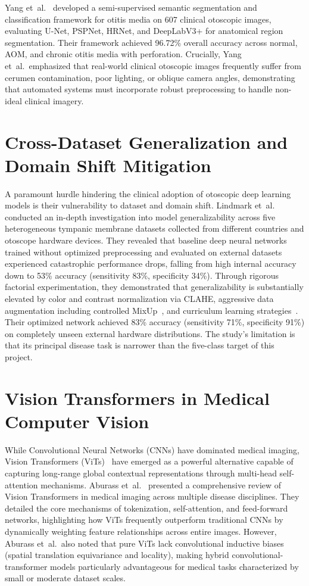 \documentclass[12pt,a4paper]{report}
\begin{document}
Yang et~al.~\cite{ref_yang2026_otitis} developed a semi-supervised semantic segmentation and classification framework for otitis media on 607 clinical otoscopic images, evaluating U-Net, PSPNet, HRNet, and DeepLabV3+ for anatomical region segmentation. Their framework achieved 96.72\% overall accuracy across normal, AOM, and chronic otitis media with perforation. Crucially, Yang et~al.\ emphasized that real-world clinical otoscopic images frequently suffer from cerumen contamination, poor lighting, or oblique camera angles, demonstrating that automated systems must incorporate robust preprocessing to handle non-ideal clinical imagery.

\section{Cross-Dataset Generalization and Domain Shift Mitigation}
A paramount hurdle hindering the clinical adoption of otoscopic deep learning models is their vulnerability to dataset and domain shift. Lindmark et~al.~\cite{ref_lindmark2024_generalizable} conducted an in-depth investigation into model generalizability across five heterogeneous tympanic membrane datasets collected from different countries and otoscope hardware devices. They revealed that baseline deep neural networks trained without optimized preprocessing and evaluated on external datasets experienced catastrophic performance drops, falling from high internal accuracy down to 53\% accuracy (sensitivity 83\%, specificity 34\%). Through rigorous factorial experimentation, they demonstrated that generalizability is substantially elevated by color and contrast normalization via CLAHE, aggressive data augmentation including controlled MixUp~\cite{ref_zhang2017_mixup}, and curriculum learning strategies~\cite{ref_bengio2009_curriculum}. Their optimized network achieved 83\% accuracy (sensitivity 71\%, specificity 91\%) on completely unseen external hardware distributions. The study's limitation is that its principal disease task is narrower than the five-class target of this project.

\section{Vision Transformers in Medical Computer Vision}
While Convolutional Neural Networks (CNNs) have dominated medical imaging, Vision Transformers (ViTs)~\cite{ref_dosovitskiy2020_vit} have emerged as a powerful alternative capable of capturing long-range global contextual representations through multi-head self-attention mechanisms. Aburass et~al.~\cite{ref_aburass2025_vit} presented a comprehensive review of Vision Transformers in medical imaging across multiple disease disciplines. They detailed the core mechanisms of tokenization, self-attention, and feed-forward networks, highlighting how ViTs frequently outperform traditional CNNs by dynamically weighting feature relationships across entire images. However, Aburass et~al.\ also noted that pure ViTs lack convolutional inductive biases (spatial translation equivariance and locality), making hybrid convolutional-transformer models particularly advantageous for medical tasks characterized by small or moderate dataset scales.
\end{document}
